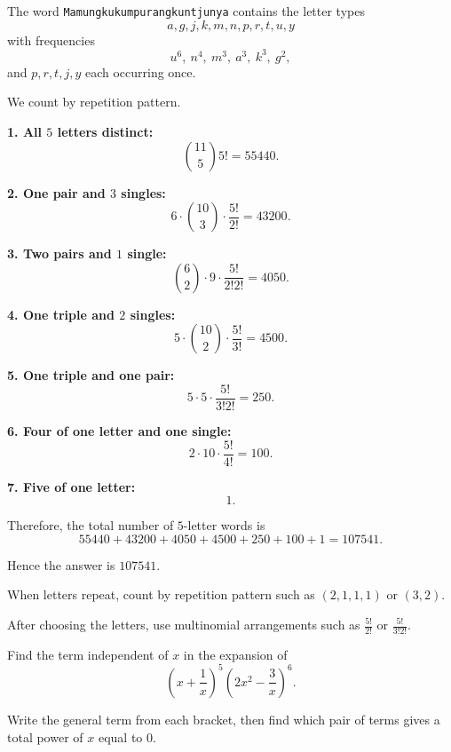 \begin{solution}
The word \texttt{Mamungkukumpurangkuntjunya} contains the letter types
\[
a,g,j,k,m,n,p,r,t,u,y
\]
with frequencies
\[
u^6,\ n^4,\ m^3,\ a^3,\ k^3,\ g^2,
\]
and $p,r,t,j,y$ each occurring once.

We count by repetition pattern.

\textbf{1. All $5$ letters distinct:}
\[
\binom{11}{5}5! = 55440.
\]

\textbf{2. One pair and $3$ singles:}
\[
6\cdot \binom{10}{3}\cdot \frac{5!}{2!}=43200.
\]

\textbf{3. Two pairs and $1$ single:}
\[
\binom{6}{2}\cdot 9 \cdot \frac{5!}{2!2!}=4050.
\]

\textbf{4. One triple and $2$ singles:}
\[
5\cdot \binom{10}{2}\cdot \frac{5!}{3!}=4500.
\]

\textbf{5. One triple and one pair:}
\[
5\cdot 5\cdot \frac{5!}{3!2!}=250.
\]

\textbf{6. Four of one letter and one single:}
\[
2\cdot 10\cdot \frac{5!}{4!}=100.
\]

\textbf{7. Five of one letter:}
\[
1.
\]

Therefore, the total number of $5$-letter words is
\[
55440+43200+4050+4500+250+100+1=107541.
\]

Hence the answer is $\boxed{107541}$.
\end{solution}

\begin{takeaways}
\item When letters repeat, count by repetition pattern such as $(2,1,1,1)$ or $(3,2)$.
\item After choosing the letters, use multinomial arrangements such as $\frac{5!}{2!}$ or $\frac{5!}{3!2!}$.
\end{takeaways}

\begin{problem}
Find the term independent of $x$ in the expansion of
\[
\left(x+\frac{1}{x}\right)^5\left(2x^2-\frac{3}{x}\right)^6.
\]
\end{problem}

\begin{hint}
Write the general term from each bracket, then find which pair of terms gives a total power of $x$ equal to $0$.
\end{hint}


